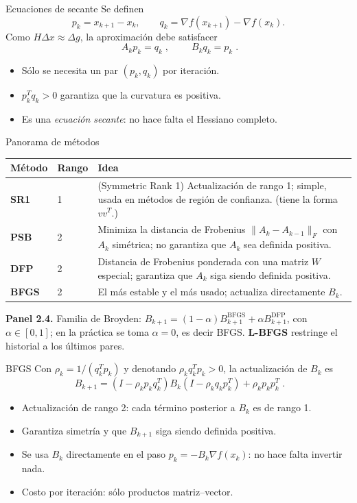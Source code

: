 \documentclass[10pt,aspectratio=169]{beamer}
\begin{document}
\begin{frame}{Ecuaciones de secante}
  \small
  Se definen
  \[
    p_k=x_{k+1}-x_k,
    \qquad
    q_k=\nabla f(x_{k+1})-\nabla f(x_k).
  \]
  Como $H\Delta x\approx\Delta g$, la aproximación debe satisfacer
  \[
    \boxed{\;A_kp_k=q_k\;},
    \qquad
    \boxed{\;B_kq_k=p_k\;}.
  \]
  \begin{itemize}
    \item Sólo se necesita un par $(p_k,q_k)$ por iteración.
    \item $p_k^{T}q_k>0$ garantiza que la curvatura es positiva.
    \item Es una \emph{ecuación secante}: no hace falta el Hessiano completo.
  \end{itemize}
\end{frame}

\begin{frame}{Panorama de métodos}
  \small
  \begin{tabularx}{\textwidth}{@{}>{\bfseries}l l X@{}}
    \toprule
    Método & Rango & Idea \\
    \midrule
    SR1 & 1 & (Symmetric Rank 1) Actualización de rango 1; simple, usada en métodos de región de confianza. (tiene la forma $vv^T$.) \\
    PSB & 2 & Minimiza la distancia de Frobenius $\lVert A_k-A_{k-1}\rVert_F$ con $A_k$ simétrica;
      no garantiza que $A_k$ sea definida positiva. \\
    DFP & 2 & Distancia de Frobenius ponderada con una matriz $W$ especial;
      garantiza que $A_k$ siga siendo definida positiva. \\
    BFGS & 2 & El más estable y el más usado; actualiza directamente $B_k$. \\
    \bottomrule
  \end{tabularx}
  \vfill
  {\scriptsize\color{gray}
    \textbf{Panel 2.4.} Familia de Broyden:
    $B_{k+1}=(1-\alpha)B^{\mathrm{BFGS}}_{k+1}+\alpha B^{\mathrm{DFP}}_{k+1}$,
    con $\alpha\in[0,1]$; en la práctica se toma $\alpha=0$, es decir BFGS.
    \textbf{L-BFGS} restringe el historial a los últimos pares.}
\end{frame}

\begin{frame}{BFGS}
  \small
  Con $\rho_k=1/(q_k^{T}p_k)$ y denotando $\rho_k q_k^{T}p_k>0$,
  la actualización de $B_k$ es
  \[
    \boxed{\;
    B_{k+1}=\left(I-\rho_kp_kq_k^{T}\right)B_k
    \left(I-\rho_kq_kp_k^{T}\right)+\rho_kp_kp_k^{T}\;}.
  \]
  \begin{itemize}
    \item Actualización de rango 2: cada término posterior a $B_k$ es de rango 1.
    \item Garantiza simetría y que $B_{k+1}$ siga siendo definida positiva.
    \item Se usa $B_k$ directamente en el paso $p_k=-B_k\nabla f(x_k)$:
      no hace falta invertir nada.
    \item Costo por iteración: sólo productos matriz--vector.
  \end{itemize}
\end{frame}
\end{document}
